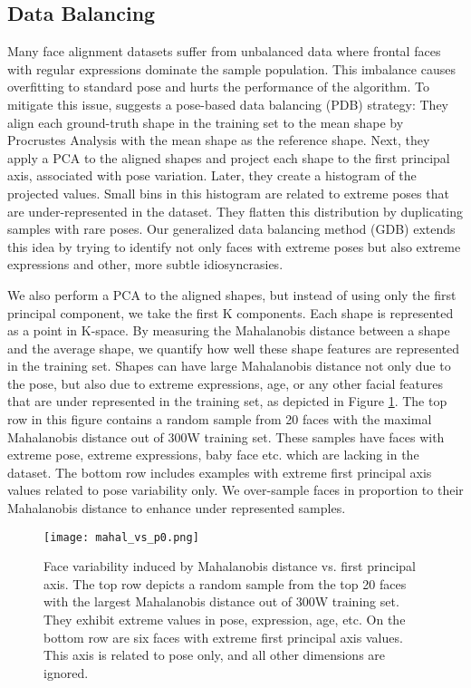 \documentclass[twocolumn]{article}
\begin{document}
\subsection{Data Balancing}

Many face alignment datasets suffer from unbalanced data where frontal faces with regular expressions dominate the sample population. This imbalance causes overfitting to standard pose and hurts the performance of the algorithm. To mitigate this issue,  \cite{feng2018wing} suggests a pose-based data balancing (PDB) strategy: They align each ground-truth shape in the training set to the mean shape by Procrustes Analysis with the mean shape as the reference shape. Next, they apply a PCA to the aligned shapes and project each shape to the first principal axis, associated with pose variation. Later, they create a histogram of the projected values. Small bins in this histogram are related to extreme poses that are under-represented in the dataset. They flatten this distribution by duplicating samples with rare poses. Our generalized data balancing method (GDB) extends this idea by trying to identify not only faces with extreme poses but also extreme expressions and other, more subtle idiosyncrasies. 

We also perform a PCA to the aligned shapes, but instead of using only the first principal component, we take the first K components. Each shape is represented as a point in K-space. By measuring the Mahalanobis distance between a shape and the average shape, we quantify how well these shape features are represented in the training set. Shapes can have large Mahalanobis distance not only due to the pose, but also due to extreme expressions, age, or any other facial features that are under represented in the training set, as depicted in Figure \ref{fig:mahal_vs_p0}. The top row in this figure contains a random sample from 20 faces with the maximal Mahalanobis distance out of 300W training set. These samples have faces with extreme pose, extreme expressions, baby face etc. which are lacking in the dataset. The bottom row includes examples with extreme first principal axis values related to pose variability only. We over-sample faces in proportion to their Mahalanobis distance to enhance under represented samples.

\begin{figure}
\texttt{[image: mahal\_vs\_p0.png]}
\caption{Face variability induced by Mahalanobis distance vs. first principal axis. The top row depicts a random sample from the top 20 faces with the largest Mahalanobis distance out of 300W training set. They exhibit extreme values in pose, expression, age, etc. On the bottom row are six faces with extreme first principal axis values. This axis is related to pose only, and all other dimensions are ignored.}
\label{fig:mahal_vs_p0}
\end{figure}
\end{document}
